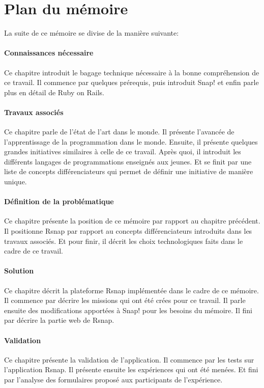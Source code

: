 \section{Plan du mémoire}
La suite de ce mémoire se divise de la manière suivante:

\paragraph{Connaissances nécessaire}
Ce chapitre introduit le bagage technique nécessaire à la bonne compréhension de ce travail. Il commence par quelques prérequis, puis introduit Snap! et enfin parle plus en détail de Ruby on Rails.

\paragraph{Travaux associés}
Ce chapitre parle de l'état de l'art dans le monde. Il présente l'avancée de l'apprentissage de la programmation dans le monde. Ensuite, il présente quelques grandes initiatives similaires à celle de ce travail. Après quoi, il introduit les différents langages de programmations enseignés aux jeunes. Et se finit par une liste de concepts différenciateurs qui permet de définir une initiative de manière unique.

\paragraph{Définition de la problématique}
Ce chapitre présente la position de ce mémoire par rapport au chapitre précédent. Il positionne Rsnap par rapport au concepts différenciateurs introduits dans les travaux associés. Et pour finir, il décrit les choix technologiques faits dans le cadre de ce travail.

\paragraph{Solution}
Ce chapitre décrit la plateforme Rsnap implémentée dans le cadre de ce mémoire.
Il commence par décrire les missions qui ont été crées pour ce travail. Il parle ensuite des modifications apportées à Snap! pour les besoins du mémoire. Il fini par décrire la partie web de Rsnap.

\paragraph{Validation}
Ce chapitre présente la validation de l'application. Il commence par les tests sur l'application Rsnap. Il présente ensuite les expériences qui ont été menées. Et fini par l'analyse des formulaires proposé aux participants de l'expérience.


